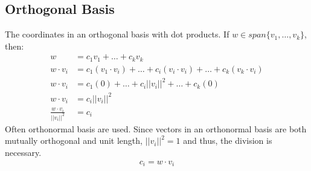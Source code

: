 \documentclass{article}
\theoremstyle{mytheoremstyle}
\theoremstyle{mytheoremstyle}
\theoremstyle{myproblemstyle}
\begin{document}
    \subsection*{Orthogonal Basis}
    The coordinates in an orthogonal basis with dot products. If $w\in
    span\{v_1,\dots,v_k\}$, then:
    \begin{align*}
        w &= c_1v_1 + \dots + c_kv_k \\
        w\cdot v_i &= c_1 (v_1\cdot v_i) + \dots + c_i(v_i\cdot v_i) + \dots + c_k(v_k\cdot v_i)\\
        w\cdot v_i &= c_1 (0) + \dots + c_i||v_i||^2 + \dots + c_k(0)\\
        w\cdot v_i &= c_i ||v_i||^2 \\
        \frac{w\cdot v_i}{||v_i||^2} &= c_i
    \end{align*}
    Often orthonormal basis are used. Since vectors in an orthonormal basis are
    both mutually orthogonal and unit length, $||v_i||^2 = 1$ and thus, the
    division is necessary.
    \begin{align*}
        c_i = w\cdot v_i
    \end{align*}
\end{document}
